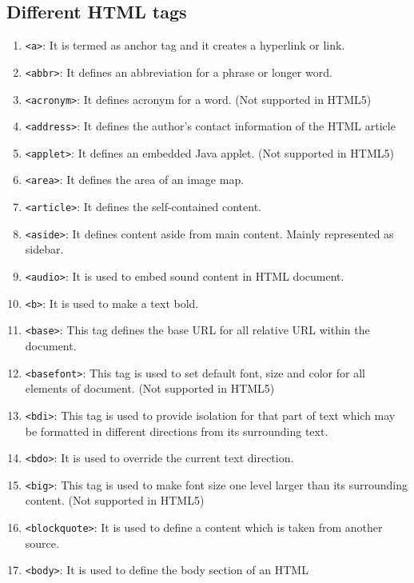 \documentclass[a4paper]{article}
\begin{document}
  \subsection{Different HTML tags}%
  \begin{enumerate}
    \item \texttt{<a>}: It is termed as anchor tag and it creates a hyperlink
      or link.
    \item \texttt{<abbr>}: It defines an abbreviation for a phrase or longer
      word.
    \item \texttt{<acronym>}: It defines acronym for a word.
      (Not supported in HTML5)
    \item \texttt{<address>}: It defines the author's contact information of
      the HTML article
    \item \texttt{<applet>}: It defines an embedded Java applet.
      (Not supported in HTML5)
    \item \texttt{<area>}: It defines the area of an image map.
    \item \texttt{<article>}: It defines the self-contained content.
    \item \texttt{<aside>}: It defines content aside from main content. 
      Mainly represented as sidebar.
    \item \texttt{<audio>}: It is used to embed sound content in HTML document.
    \item \texttt{<b>}: It is used to make a text bold.
    \item \texttt{<base>}: This tag defines the base URL for all relative URL
      within the document.
    \item \texttt{<basefont>}: This tag is used to set default font, size and
      color for all elements of document. (Not supported in HTML5)
    \item \texttt{<bdi>}: This tag is used to provide isolation for that part
      of text which may be formatted in different directions from its 
      surrounding text.
    \item \texttt{<bdo>}: It is used to override the current text direction.
    \item \texttt{<big>}: This tag is used to make font size one level larger
      than its surrounding content. (Not supported in HTML5)
    \item \texttt{<blockquote>}: It is used to define a content which is taken
      from another source.
    \item \texttt{<body>}: It is used to define the body section of an HTML

\end{enumerate}
\end{document}
